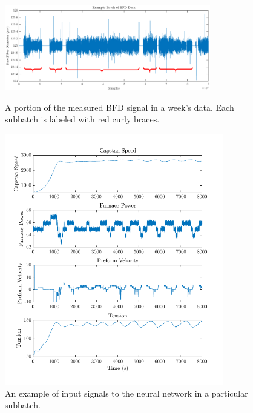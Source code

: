 \begin{figure}[hp!]
    \centering
    \includegraphics[width=0.8\textwidth]{figures/example_bfd2.png}
    \caption{A portion of the measured BFD signal in a week's data. Each subbatch is labeled with red curly braces.}
    \label{fig:example_bfd}
    
    \includegraphics[width=0.85\textwidth]{figures/values.png}
    \caption{An example of input signals to the neural network in a particular subbatch.}
    \label{fig:example_values}
\end{figure}

